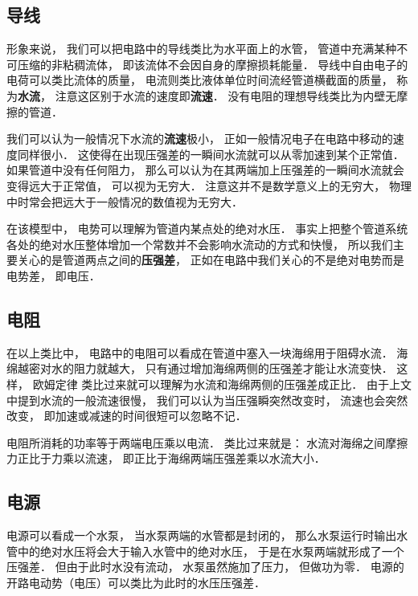 
\begin{issues}
\issueDraft
\end{issues}

\subsection{导线}
形象来说， 我们可以把电路中的导线类比为水平面上的水管， 管道中充满某种不可压缩的非粘稠流体， 即该流体不会因自身的摩擦损耗能量． 导线中自由电子的电荷可以类比流体的质量， 电流则类比液体单位时间流经管道横截面的质量， 称为\textbf{水流}， 注意这区别于水流的速度即\textbf{流速}． 没有电阻的理想导线类比为内壁无摩擦的管道．

我们可以认为一般情况下水流的\textbf{流速}极小， 正如一般情况电子在电路中移动的速度同样很小． 这使得在出现压强差的一瞬间水流就可以从零加速到某个正常值． 如果管道中没有任何阻力， 那么可以认为在其两端加上压强差的一瞬间水流就会变得远大于正常值， 可以视为无穷大． 注意这并不是数学意义上的无穷大， 物理中时常会把远大于一般情况的数值视为无穷大．

在该模型中， 电势可以理解为管道内某点处的绝对水压． 事实上把整个管道系统各处的绝对水压整体增加一个常数并不会影响水流动的方式和快慢， 所以我们主要关心的是管道两点之间的\textbf{压强差}， 正如在电路中我们关心的不是绝对电势而是电势差， 即电压．

\subsection{电阻}
在以上类比中， 电路中的电阻可以看成在管道中塞入一块海绵用于阻碍水流． 海绵越密对水的阻力就越大， 只有通过增加海绵两侧的压强差才能让水流变快． 这样， 欧姆定律 类比过来就可以理解为水流和海绵两侧的压强差成正比． 由于上文中提到水流的一般流速很慢， 我们可以认为当压强瞬突然改变时， 流速也会突然改变， 即加速或减速的时间很短可以忽略不记．

电阻所消耗的功率等于两端电压乘以电流． 类比过来就是： 水流对海绵之间摩擦力正比于力乘以流速， 即正比于海绵两端压强差乘以水流大小．

\subsection{电源}
电源可以看成一个水泵， 当水泵两端的水管都是封闭的， 那么水泵运行时输出水管中的绝对水压将会大于输入水管中的绝对水压， 于是在水泵两端就形成了一个压强差． 但由于此时水没有流动， 水泵虽然施加了压力， 但做功为零． 电源的开路电动势（电压）可以类比为此时的水压压强差．

